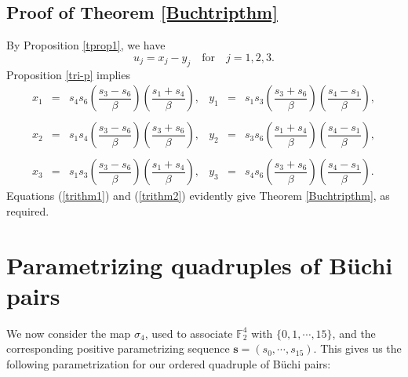 \documentclass[letterpaper,10pt]{amsart}
\newcommand{\bF}{{\mathbb{F}}}
\newcommand{\Bs}{{\mathbf{s}}}
\theoremstyle{definition}
\numberwithin{equation}{section}
\begin{document}
\subsection{Proof of Theorem \ref{Buchtripthm}} By Proposition \ref{tprop1}, we have 
\begin{equation} \label{trithm1} u_j = x_j - y_j \quad \text{for} \quad j = 1,2,3.\end{equation} 
Proposition \ref{tri-p} implies 
\begin{equation} \label{trithm2} 
\begin{matrix} x_1 & = & s_4 s_6 \left(\dfrac{s_3 - s_6}{\beta} \right) \left(\dfrac{s_1 + s_4}{\beta} \right), & y_1 & = & s_1 s_3 \left(\dfrac{s_3 + s_6}{\beta} \right) \left(\dfrac{s_4 - s_1}{\beta} \right), \\ \\
x_2 & = & s_1 s_4 \left(\dfrac{s_3 - s_6}{\beta} \right) \left(\dfrac{s_3 + s_6}{\beta} \right), & y_2 & = & s_3 s_6 \left(\dfrac{s_1 + s_4}{\beta} \right) \left(\dfrac{s_4 - s_1}{\beta} \right), \\ \\
x_3 & = & s_1 s_3 \left(\dfrac{s_3 - s_6}{\beta} \right) \left(\dfrac{s_1 + s_4}{\beta} \right), & y_3 & = & s_4 s_6 \left(\dfrac{s_3 + s_6}{\beta} \right) \left(\dfrac{s_4 - s_1}{\beta} \right).
\end{matrix}
\end{equation}  
Equations (\ref{trithm1}) and (\ref{trithm2}) evidently give Theorem \ref{Buchtripthm}, as required. 

\section{Parametrizing quadruples of B\"{u}chi pairs} 
\label{quadsec}

We now consider the map $\sigma_4$, used to associate $\bF_2^4$ with $\{0,1, \cdots, 15\}$, and the corresponding positive parametrizing sequence $\Bs = (s_0, \cdots, s_{15})$. This gives us the following parametrization for our ordered quadruple of B\"{u}chi pairs:
\end{document}
